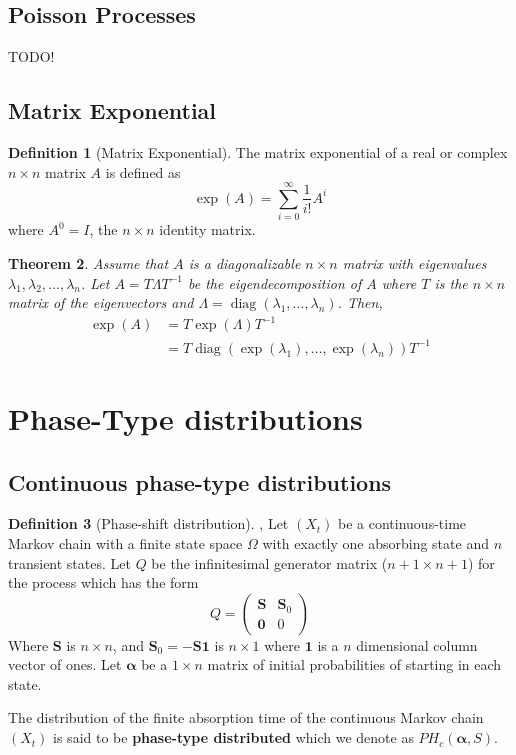 \documentclass{article}
\theoremstyle{plain}
\newtheorem{theorem}{Theorem}[section]
\theoremstyle{definition}
\newtheorem{defn}[theorem]{Definition}
\theoremstyle{remark}
\numberwithin{equation}{section}
\begin{document}
\subsection{Poisson Processes}
TODO!

\subsection{Matrix Exponential}

\begin{defn}[Matrix Exponential]
The matrix exponential of a real or complex $n \times n$ matrix $A$ is defined as
$$
\exp(A) = \sum_{i = 0}^\infty \frac{1}{i!} A^i
$$
where $A^0 = I$, the $n \times n$ identity matrix.
\end{defn}

\begin{theorem} \label{thm:eigen_matrix_exp}
Assume that $A$ is a diagonalizable $n \times n$ matrix with eigenvalues $\lambda_1, \lambda_2, \ldots, \lambda_n$.
Let $A = T \Lambda T^{-1}$ be the eigendecomposition of $A$ where $T$ is the $n \times n$ matrix of the eigenvectors and $\Lambda = \operatorname{diag}(\lambda_1, \ldots, \lambda_n)$.
Then,
\begin{align*}
    \exp(A) &= T \exp(\Lambda) T^{-1}\\
    &= T \operatorname{diag}(\exp(\lambda_1), \ldots, \exp(\lambda_n)) T^{-1}
\end{align*}
\end{theorem}

\section{Phase-Type distributions}

\subsection{Continuous phase-type distributions}
\begin{defn}[Phase-shift distribution] %
\cite{neuts1981}, \cite{maier1992}
Let $(X_t)$ be a continuous-time Markov chain with a finite state space $\Omega$ with exactly one absorbing state and $n$ transient states.
Let $Q$ be the infinitesimal generator matrix ($n + 1 \times n + 1$) for the process which has the form
$$
Q = \begin{pmatrix}
\mathbf{S} & \mathbf{S}_0\\
\mathbf{0} & 0
\end{pmatrix}
$$
Where $\mathbf{S}$ is $n \times n$, and $\mathbf{S}_0 = - \mathbf{S} \mathbf{1}$ is $n \times 1$ where $\mathbf{1}$ is a $n$ dimensional column vector of ones.
Let $\boldsymbol{\alpha}$ be a $1 \times n$ matrix of initial probabilities of starting in each state.

The distribution of the finite absorption time of the  continuous Markov chain $(X_t)$ is said to be \textbf{phase-type distributed} which we denote as $PH_c(\boldsymbol{\alpha}, S)$.
\end{defn}
\end{document}
